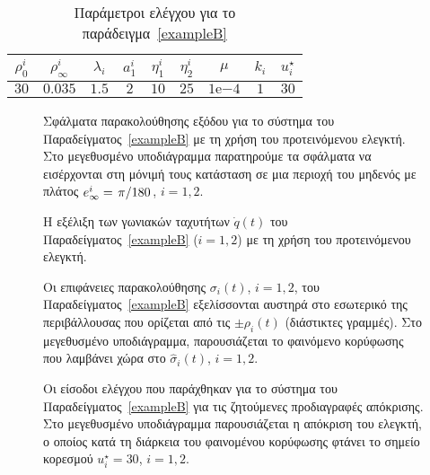 \begin{table}
    \centering
    \caption{Παράμετροι ελέγχου για το παράδειγμα~\ref{exampleB}}
    \label{tab:control_params2}
    \begin{tabular}{ccccccccc}
        \toprule
        $\rho_0^i$ & $\rho_\infty^i$ & $\lambda_i$ & $a_1^i$ & $\eta_1^i$
            & $\eta_2^i$ & $\mu$ & $k_i$ & $u_i^\star$ \\ \midrule
        $30$ & $0.035$ & $1.5$ & $2$ & $10$ & $25$ & $1\mathrm{e}{-4}$ & $1$ & $30$ \\ \bottomrule

    \end{tabular}
\end{table}

\begin{figure}[tb]
    \centering
    
    \caption{Σφάλματα παρακολούθησης εξόδου για το σύστημα του Παραδείγματος~\ref{exampleB} με τη χρήση του προτεινόμενου ελεγκτή. Στο μεγεθυσμένο υποδιάγραμμα παρατηρούμε τα σφάλματα να εισέρχονται στη μόνιμή τους κατάσταση σε μια περιοχή του μηδενός με πλάτος $e^i_\infty = \flatfrac{\pi}{180}$, $i =1,2$.}
    \label{fig:exB tracking errors}
\end{figure}

\begin{figure}[tb]
    \centering
    
    \caption{Η εξέλιξη των γωνιακών ταχυτήτων $\dot q(t)$ του Παραδείγματος~\ref{exampleB} ($i = 1,2$) με τη χρήση του προτεινόμενου ελεγκτή.}
    \label{fig:exB states}
\end{figure}

\begin{figure}[tb]
    \centering
    
    \caption{Οι επιφάνειες παρακολούθησης $\sigma_i(t)$, $i= 1,2$, του Παραδείγματος~\ref{exampleB} εξελίσσονται αυστηρά στο εσωτερικό της περιβάλλουσας που ορίζεται από τις $\pm \rho_i(t)$ (διάστικτες γραμμές). Στο μεγεθυσμένο υποδιάγραμμα, παρουσιάζεται το φαινόμενο κορύφωσης που λαμβάνει χώρα στο $\hat \sigma_i(t)$, $i= 1,2$.}
    \label{fig:exB controls}
\end{figure}

\begin{figure}[tb]
    \centering
    
    \caption{Οι είσοδοι ελέγχου που παράχθηκαν για το σύστημα του Παραδείγματος~\ref{exampleB} για τις ζητούμενες προδιαγραφές απόκρισης. Στο μεγεθυσμένο υποδιάγραμμα παρουσιάζεται η απόκριση του ελεγκτή, ο οποίος κατά τη διάρκεια του φαινομένου κορύφωσης φτάνει το σημείο κορεσμού $u_i^\star = 30$, $i =1,2$.}
    \label{fig:exB surfaces}
\end{figure}

